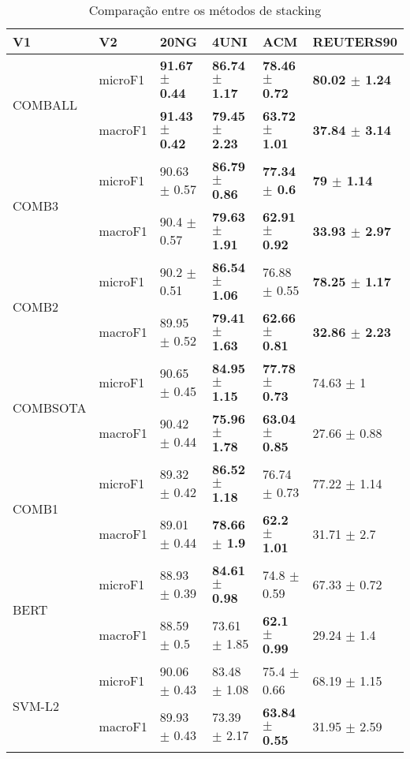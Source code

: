 \documentclass[]{article}
\begin{document}
\begin{table}[ht]
\centering
\begin{tabular}{llllll}
  \hline
V1 & V2 & 20NG & 4UNI & ACM & REUTERS90 \\ 
  \cline{3-6} \hline
\multirow{2}{*}{COMBALL} & microF1 & \bf{91.67 $\pm$  0.44} & \bf{86.74 $\pm$  1.17} & \bf{78.46 $\pm$  0.72} & \bf{80.02 $\pm$  1.24} \\ 
   & macroF1 & \bf{91.43 $\pm$  0.42} & \bf{79.45 $\pm$  2.23} & \bf{63.72 $\pm$  1.01} & \bf{37.84 $\pm$  3.14} \\ 
   \cline{3-6}\multirow{2}{*}{COMB3} & microF1 & 90.63 $\pm$  0.57 & \bf{86.79 $\pm$  0.86} & \bf{77.34 $\pm$  0.6} & \bf{79 $\pm$  1.14} \\ 
   & macroF1 & 90.4 $\pm$  0.57 & \bf{79.63 $\pm$  1.91} & \bf{62.91 $\pm$  0.92} & \bf{33.93 $\pm$  2.97} \\ 
   \cline{3-6}\multirow{2}{*}{COMB2} & microF1 & 90.2 $\pm$  0.51 & \bf{86.54 $\pm$  1.06} & 76.88 $\pm$  0.55 & \bf{78.25 $\pm$  1.17} \\ 
   & macroF1 & 89.95 $\pm$  0.52 & \bf{79.41 $\pm$  1.63} & \bf{62.66 $\pm$  0.81} & \bf{32.86 $\pm$  2.23} \\ 
   \cline{3-6}\multirow{2}{*}{COMBSOTA} & microF1 & 90.65 $\pm$  0.45 & \bf{84.95 $\pm$  1.15} & \bf{77.78 $\pm$  0.73} & 74.63 $\pm$  1 \\ 
   & macroF1 & 90.42 $\pm$  0.44 & \bf{75.96 $\pm$  1.78} & \bf{63.04 $\pm$  0.85} & 27.66 $\pm$  0.88 \\ 
   \cline{3-6}\multirow{2}{*}{COMB1} & microF1 & 89.32 $\pm$  0.42 & \bf{86.52 $\pm$  1.18} & 76.74 $\pm$  0.73 & 77.22 $\pm$  1.14 \\ 
   & macroF1 & 89.01 $\pm$  0.44 & \bf{78.66 $\pm$  1.9} & \bf{62.2 $\pm$  1.01} & 31.71 $\pm$  2.7 \\ 
   \cline{3-6}\multirow{2}{*}{BERT} & microF1 & 88.93 $\pm$  0.39 & \bf{84.61 $\pm$  0.98} & 74.8 $\pm$  0.59 & 67.33 $\pm$  0.72 \\ 
   & macroF1 & 88.59 $\pm$  0.5 & 73.61 $\pm$  1.85 & \bf{62.1 $\pm$  0.99} & 29.24 $\pm$  1.4 \\ 
   \cline{3-6}\multirow{2}{*}{SVM-L2} & microF1 & 90.06 $\pm$  0.43 & 83.48 $\pm$  1.08 & 75.4 $\pm$  0.66 & 68.19 $\pm$  1.15 \\ 
   & macroF1 & 89.93 $\pm$  0.43 & 73.39 $\pm$  2.17 & \bf{63.84 $\pm$  0.55} & 31.95 $\pm$  2.59 \\ 
   \cline{3-6}\end{tabular}
\caption{Comparação entre os métodos de stacking} 
\label{tab:stacking}
\end{table}
\end{document}
